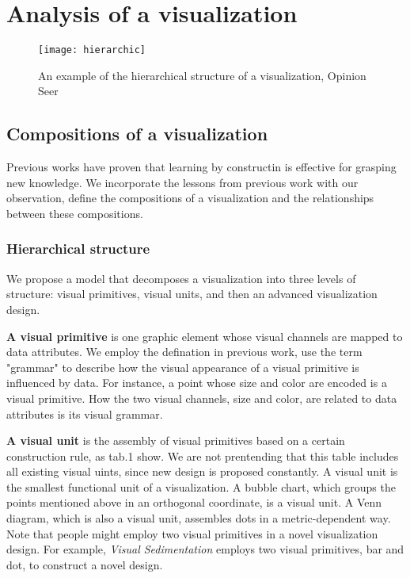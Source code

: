 \section{Analysis of a visualization} 

\begin{figure}
 \centering %
 \texttt{[image: hierarchic]}
 \caption{An example of the hierarchical structure of a visualization, Opinion Seer\cite{wu_opinionseer:_2010}}
 \label{fig:hierarchic}
\end{figure}




\subsection{Compositions of a visualization}
Previous works have proven that learning by constructin is effective for grasping new knowledge.\cite{huron_constructive_2014, chapman_constructive_1988}  We incorporate the lessons from previous work\cite{munzner_visualization_2014, huron_constructive_2014, chi_taxonomy_2000}  with our observation, define the compositions of a visualization and the relationships between these compositions. 

\subsubsection{Hierarchical structure}
We propose a model that decomposes a visualization into three levels of structure: visual primitives, visual units, and then an advanced visualization design. 

\textbf{A visual primitive} is one graphic element whose visual channels are mapped to data attributes. We employ the defination in previous work\cite{huron_constructive_2014, satyanarayan_vega-lite:_2017}, use the term "grammar" to describe how the visual appearance of a visual primitive is influenced by data. For instance, a point whose size and color are encoded is a visual primitive. How the two visual channels, size and color, are related to data attributes is its visual grammar. 

\textbf{A visual unit} is the assembly of visual primitives based on a certain construction rule, as tab.1 show. We are not prentending that this table includes all existing visual uints, since new design is proposed constantly. A visual unit is the smallest functional unit of a visualization. A bubble chart, which groups the points mentioned above in an orthogonal coordinate, is a visual unit. A Venn diagram, which is also a visual unit, assembles dots in a metric-dependent way.  Note that people might employ two visual primitives in a novel visualization design. For example, \textit{Visual Sedimentation}\cite{huron_visual_2013} employs two visual primitives, bar and dot, to construct a novel design. 

